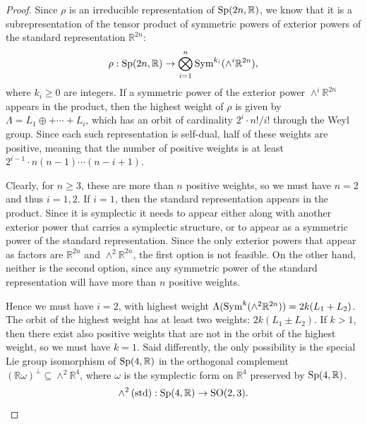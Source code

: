 \documentclass{report}
\begin{document}
\begin{itemize}
\begin{proof}
    Since $\rho$ is an irreducible representation of $\operatorname{{\mathrm{Sp}}}(2n, \mathbb R)$, we know that it is a subrepresentation of the tensor product of symmetric powers of exterior powers of the standard representation $\mathbb R^{2n}$:
    \[
    \rho: \operatorname{{\mathrm{Sp}}}(2n, \mathbb R) \to \bigotimes_{i=1}^n \operatorname{Sym}^{k_i}(\wedge^i \mathbb R^{2n}),
    \]
    where $k_i \geq 0$ are integers.
    If a symmetric power of the exterior power $\wedge^i \mathbb R^{2n}$ appears in the product, then the highest weight of $\rho$ is given by $\Lambda = L_1 \oplus +\cdots + L_i$, which has an orbit of cardinality $2^i \cdot n!/i!$ through the Weyl group.
    Since each such representation is self-dual, half of these weights are positive, meaning that the number of positive weights is at least $2^{i-1} \cdot n (n-1) \cdots (n-i+1)$.
    
    Clearly, for $n \geq 3$, these are more than $n$ positive weights, so we must have $n = 2$ and thus $i = 1,2$.
    If $i = 1$, then the standard representation appears in the product.
    Since it is symplectic it needs to appear either along with another exterior power that carries a symplectic structure, or to appear as a symmetric power of the standard representation.
    Since the only exterior powers that appear as factors are $\mathbb R^{2n}$ and $\wedge^2 \mathbb R^{2n}$, the first option is not feasible.
    On the other hand, neither is the second option, since any symmetric power of the standard representation will have more than $n$ positive weights.

    Hence we must have $i = 2$, with highest weight $\Lambda(\operatorname{Sym}^k(\wedge^2 \mathbb R^{2n})) = 2k(L_1 + L_2)$.
    The orbit of the highest weight has at least two weights: $2k(L_1 \pm L_2)$.
    If $k > 1$, then there exist also positive weights that are not in the orbit of the highest weight, so we must have $k = 1$.
    Said differently, the only possibility is the special Lie group isomorphism of $\operatorname{{\mathrm{Sp}}}(4, \mathbb R)$ in the orthogonal complement $(\mathbb R \omega)^\perp \subseteq \wedge^2 \mathbb R^4$, where $\omega$ is the symplectic form on $\mathbb R^4$ preserved by $\operatorname{{\mathrm{Sp}}}(4, \mathbb R)$.
    \[
    \wedge^2\left(\mathrm{std}\right): \operatorname{{\mathrm{Sp}}}(4, \mathbb R) \to \operatorname{{\mathrm{SO}}}(2,3).
    \]
\end{proof}
\end{itemize}
\end{document}

